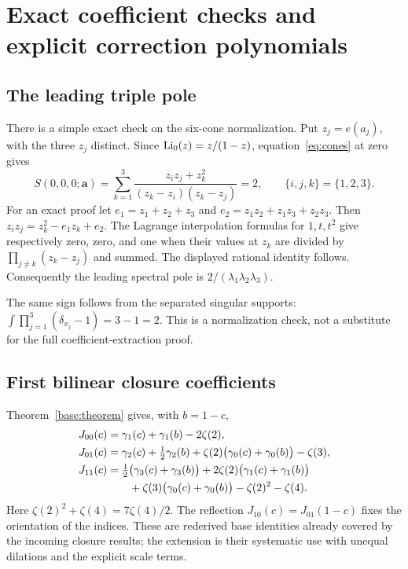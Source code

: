 \section{Exact coefficient checks and explicit correction polynomials}
\label{app:exact}

\subsection{The leading triple pole}

There is a simple exact check on the six-cone normalization.  Put
$z_j=e(a_j)$, with the three $z_j$ distinct.  Since
$\operatorname{Li}_0(z)=z/(1-z)$, equation~\eqref{eq:cones} at zero gives
\begin{equation}\label{eq:sixcone-zero-check}
 S(0,0,0;\boldsymbol a)=
 \sum_{k=1}^3\frac{z_i z_j+z_k^2}{(z_k-z_i)(z_k-z_j)}=2,
 \qquad\{i,j,k\}=\{1,2,3\}.
\end{equation}
For an exact proof let $e_1=z_1+z_2+z_3$ and
$e_2=z_1z_2+z_1z_3+z_2z_3$.  Then
$z_i z_j=z_k^2-e_1z_k+e_2$.  The Lagrange interpolation formulas for
$1,t,t^2$ give respectively zero, zero, and one when their values at
$z_k$ are divided by $\prod_{j\ne k}(z_k-z_j)$ and summed.  The
displayed rational identity follows.  Consequently the leading
spectral pole is $2/(\lambda_1\lambda_2\lambda_3)$.

The same sign follows from the separated singular supports:
$\int\prod_{j=1}^3(\delta_{x_j}-1)=3-1=2$.
This is a normalization check, not a substitute for the full
coefficient-extraction proof.

\subsection{First bilinear closure coefficients}

Theorem~\ref{base:theorem} gives, with $b=1-c$,
\begin{align}
 J_{00}(c)&=\gamma_1(c)+\gamma_1(b)-2\zeta(2),\\
 J_{01}(c)&=\gamma_2(c)+\tfrac12\gamma_2(b)
   +\zeta(2)\bigl(\gamma_0(c)+\gamma_0(b)\bigr)-\zeta(3),\\
 J_{11}(c)&=\tfrac12\bigl(\gamma_3(c)+\gamma_3(b)\bigr)
   +2\zeta(2)\bigl(\gamma_1(c)+\gamma_1(b)\bigr)\notag\\
 &\qquad+\zeta(3)\bigl(\gamma_0(c)+\gamma_0(b)\bigr)
       -\zeta(2)^2-\zeta(4).
 \label{eq:base-first-rows}
\end{align}
Here $\zeta(2)^2+\zeta(4)=7\zeta(4)/2$.  The reflection
$J_{10}(c)=J_{01}(1-c)$ fixes the orientation of the indices.
These are rederived base identities already covered by the incoming
closure results; the extension is their systematic use with unequal
dilations and the explicit scale terms.

